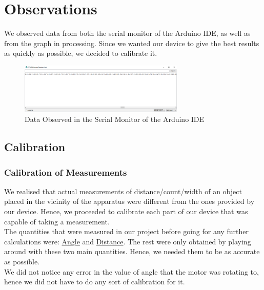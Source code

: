 \chapter{Observations}
We observed data from both the serial monitor of the Arduino IDE, as well as from the graph in processing. Since we wanted our device to give the best results as quickly as possible, we decided to calibrate it.
\begin{figure}[H]
	\vfill
	\centering
	\includegraphics[width=0.7\textwidth]{../Files/sermon}
	\caption{Data Observed in the Serial Monitor of the Arduino IDE}  \label{fig:sermon}
\end{figure}
\section{Calibration}
\subsection{Calibration of Measurements}
We realised that actual measurements of distance/count/width of an object placed in the vicinity of the apparatus were different from the ones provided by our device. Hence, we proceeded to calibrate each part of our device that was capable of taking a measurement.\\

The quantities that were measured in our project before going for any further calculations were: \underline{Angle} and \underline{Distance}. The rest were only obtained by playing around with these two main quantities. Hence, we needed them to be as accurate as possible.\\

We did not notice any error in the value of angle that the motor was rotating to, hence we did not have to do any sort of calibration for it.\\

